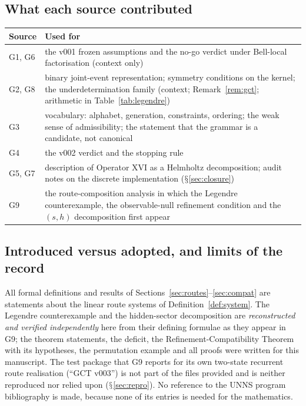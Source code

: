 \documentclass[11pt,a4paper]{article}
\renewcommand{\S}{\ensuremath{\mathsection}}
\theoremstyle{plain}
\theoremstyle{definition}
\begin{document}
\subsection{What each source contributed}
\begin{center}\small
\begin{tabularx}{\textwidth}{@{}l>{\raggedright\arraybackslash}X@{}}
\toprule
Source & Used for\\
\midrule
G1, G6 & the v001 frozen assumptions and the no-go verdict under Bell-local factorisation (context only)\\
G2, G8 & binary joint-event representation; symmetry conditions on the kernel; the underdetermination family (context; Remark~\ref{rem:gct}; arithmetic in Table~\ref{tab:legendre})\\
G3 & vocabulary: alphabet, generation, constraints, ordering; the weak sense of admissibility; the statement that the grammar is a candidate, not canonical\\
G4 & the v002 verdict and the stopping rule\\
G5, G7 & description of Operator XVI as a Helmholtz decomposition; audit notes on the discrete implementation (\S\ref{sec:closure})\\
G9 & the route-composition analysis in which the Legendre counterexample, the observable-null refinement condition and the $(s,h)$ decomposition first appear\\
\bottomrule
\end{tabularx}
\end{center}

\subsection{Introduced versus adopted, and limits of the record}
All formal definitions and results of Sections~\ref{sec:routes}--\ref{sec:compat} are statements about the linear route systems of Definition~\ref{def:system}. The Legendre counterexample and the hidden-sector decomposition are \emph{reconstructed and verified independently} here from their defining formulae as they appear in G9; the theorem statements, the deficit, the Refinement-Compatibility Theorem with its hypotheses, the permutation example and all proofs were written for this manuscript. The test package that G9 reports for its own two-state recurrent route realisation (``GCT v003'') is not part of the files provided and is neither reproduced nor relied upon (\S\ref{sec:repro}). No reference to the UNNS program bibliography is made, because none of its entries is needed for the mathematics.
\end{document}

